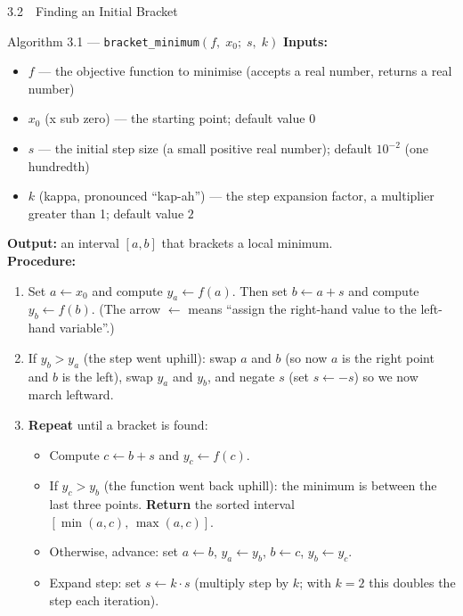 \documentclass[aspectratio=169,10pt]{beamer}
\begin{document}
\begin{frame}[allowframebreaks]{3.2\ \ Finding an Initial Bracket}
  \begin{block}{Algorithm 3.1 --- \texttt{bracket\_minimum}$(f,\; x_0;\; s,\; k)$}
    \textbf{Inputs:}
    \begin{itemize}
      \item $f$ --- the objective function to minimise (accepts a real number,
            returns a real number)
      \item $x_0$ (x sub zero) --- the starting point; default value $0$
      \item $s$ --- the initial step size (a small positive real number);
            default $10^{-2}$ (one hundredth)
      \item $k$ (kappa, pronounced ``kap-ah'') --- the step expansion factor,
            a multiplier greater than 1; default value $2$
    \end{itemize}
    \textbf{Output:} an interval $[a, b]$ that brackets a local minimum.\\[4pt]
    \textbf{Procedure:}
    \begin{enumerate}
      \item Set $a \leftarrow x_0$ and compute $y_a \leftarrow f(a)$.  Then
            set $b \leftarrow a + s$ and compute $y_b \leftarrow f(b)$.
            (The arrow $\leftarrow$ means ``assign the right-hand value to
            the left-hand variable''.)
      \item If $y_b > y_a$ (the step went uphill): swap $a$ and $b$ (so now
            $a$ is the right point and $b$ is the left), swap $y_a$ and $y_b$,
            and negate $s$ (set $s \leftarrow -s$) so we now march leftward.
      \item \textbf{Repeat} until a bracket is found:
        \begin{itemize}
          \item Compute $c \leftarrow b + s$ and $y_c \leftarrow f(c)$.
          \item If $y_c > y_b$ (the function went back uphill): the minimum
                is between the last three points.  \textbf{Return} the sorted
                interval $[\min(a,c),\, \max(a,c)]$.
          \item Otherwise, advance: set $a \leftarrow b$, $y_a \leftarrow y_b$,
                $b \leftarrow c$, $y_b \leftarrow y_c$.
          \item Expand step: set $s \leftarrow k \cdot s$ (multiply step
                by $k$; with $k = 2$ this doubles the step each iteration).
        \end{itemize}
    \end{enumerate}
  \end{block}


\end{frame}
\end{document}
